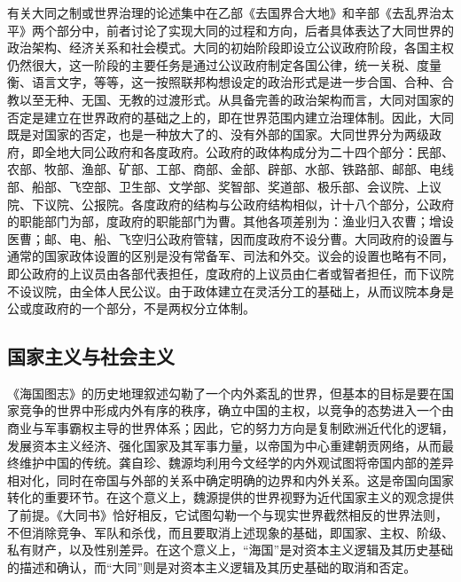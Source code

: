 \documentclass[a4paper, 12pt, openright]{ctexbook}
\begin{document}
有关大同之制或世界治理的论述集中在乙部《去国界合大地》和辛部《去乱界治太平》两个部分中，前者讨论了实现大同的过程和方向，后者具体表达了大同世界的政治架构、经济关系和社会模式。大同的初始阶段即设立公议政府阶段，各国主权仍然很大，这一阶段的主要任务是通过公议政府制定各国公律，统一关税、度量衡、语言文字，等等，这一按照联邦构想设定的政治形式是进一步合国、合种、合教以至无种、无国、无教的过渡形式。从具备完善的政治架构而言，大同对国家的否定是建立在世界政府的基础之上的，即在世界范围内建立治理体制。因此，大同既是对国家的否定，也是一种放大了的、没有外部的国家。大同世界分为两级政府，即全地大同公政府和各度政府。公政府的政体构成分为二十四个部分：民部、农部、牧部、渔部、矿部、工部、商部、金部、辟部、水部、铁路部、邮部、电线部、船部、飞空部、卫生部、文学部、奖智部、奖道部、极乐部、会议院、上议院、下议院、公报院。各度政府的结构与公政府结构相似，计十八个部分，公政府的职能部门为部，度政府的职能部门为曹。其他各项差别为：渔业归入农曹；增设医曹；邮、电、船、飞空归公政府管辖，因而度政府不设分曹。大同政府的设置与通常的国家政体设置的区别是没有常备军、司法和外交。议会的设置也略有不同，即公政府的上议员由各部代表担任，度政府的上议员由仁者或智者担任，而下议院不设议院，由全体人民公议。由于政体建立在灵活分工的基础上，从而议院本身是公或度政府的一个部分，不是两权分立体制。

\subsection{国家主义与社会主义}

《海国图志》的历史地理叙述勾勒了一个内外紊乱的世界，但基本的目标是要在国家竞争的世界中形成内外有序的秩序，确立中国的主权，以竞争的态势进入一个由商业与军事霸权主导的世界体系；因此，它的努力方向是复制欧洲近代化的逻辑，发展资本主义经济、强化国家及其军事力量，以帝国为中心重建朝贡网络，从而最终维护中国的传统。龚自珍、魏源均利用今文经学的内外观试图将帝国内部的差异相对化，同时在帝国与外部的关系中确定明确的边界和内外关系。这是帝国向国家转化的重要环节。在这个意义上，魏源提供的世界视野为近代国家主义的观念提供了前提。《大同书》恰好相反，它试图勾勒一个与现实世界截然相反的世界法则，不但消除竞争、军队和杀伐，而且要取消上述现象的基础，即国家、主权、阶级、私有财产，以及性别差异。在这个意义上，“海国”是对资本主义逻辑及其历史基础的描述和确认，而“大同”则是对资本主义逻辑及其历史基础的取消和否定。
\end{document}
